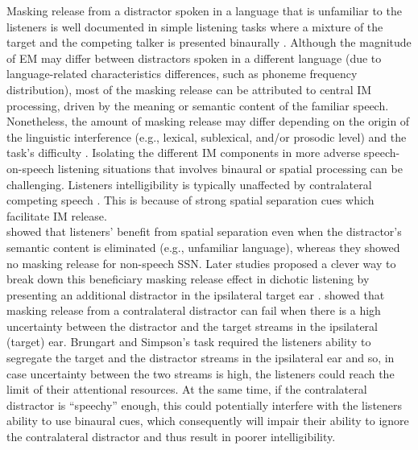 \documentclass[a4paper, twoside]{templates/ociamthesis}
\begin{document}
Masking release from a distractor spoken in a language that is unfamiliar to the listeners is well documented in simple listening tasks where a mixture of the target and the competing talker is presented binaurally \autocites[e.g.,][]{Freyman2001,Rhebergen2005,Calandruccio2010}. Although the magnitude of EM may differ between distractors spoken in a different language (due to language-related characteristics differences, such as phoneme frequency distribution), most of the masking release can be attributed to central IM processing, driven by the meaning or semantic content of the familiar speech. Nonetheless, the amount of masking release may differ depending on the origin of the linguistic interference (e.g., lexical, sublexical, and/or prosodic level) and the task's difficulty \autocite{VanEngen2007,Calandruccio2010,Calandruccio2014,Brouwer2012}. Isolating the different IM components in more adverse speech-on-speech listening situations that involves binaural or spatial processing can be challenging. Listeners intelligibility is typically unaffected by contralateral competing speech \autocites[e.g.,][]{Cherry1953,Moray1959,Drullman2000}. This is because of strong spatial separation cues which facilitate IM release.\\

\textcite{Freyman1999} showed that listeners' benefit from spatial separation even when the distractor's semantic content is eliminated (e.g., unfamiliar language), whereas they showed no masking release for non-speech SSN. Later studies proposed a clever way to break down this beneficiary masking release effect in dichotic listening by presenting an additional distractor in the ipsilateral target ear \autocite{Brungart2002,Carlile2015}. \textcite{Brungart2002} showed that masking release from a contralateral distractor can fail when there is a high uncertainty between the distractor and the target streams in the ipsilateral (target) ear. Brungart and Simpson's task required the listeners ability to segregate the target and the distractor streams in the ipsilateral ear and so, in case uncertainty between the two streams is high, the listeners could reach the limit of their attentional resources. At the same time, if the contralateral distractor is ``speechy'' enough, this could potentially interfere with the listeners ability to use binaural cues, which consequently will impair their ability to ignore the contralateral distractor and thus result in poorer intelligibility.\\
\end{document}
